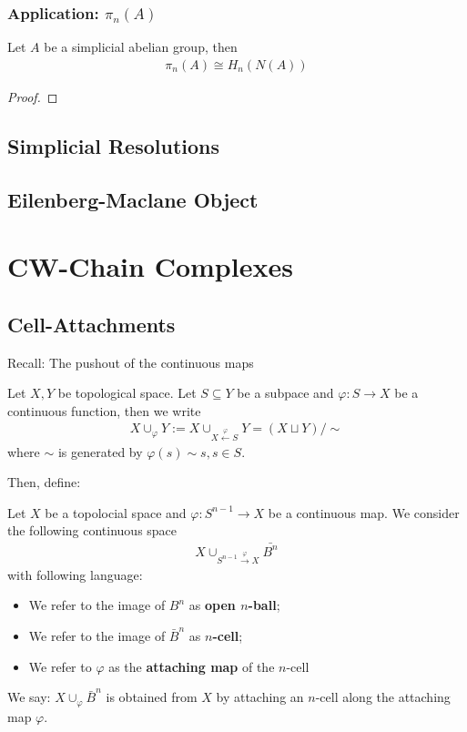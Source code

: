 \documentclass[Total.tex]{subfiles}
\begin{document}
			\subsection{Application: $\pi_n(A)$}
				\begin{corollary}
					Let $A$ be a simplicial abelian group, then
					\begin{gather*}
						\pi_n(A)\cong H_n(N(A))
					\end{gather*}
				\end{corollary}
				\begin{proof}
					
				\end{proof}
		\section{Simplicial Resolutions}
		\section{Eilenberg-Maclane Object}
	\chapter{CW-Chain Complexes}
		\section{Cell-Attachments}
			Recall: The pushout of the continuous maps
			\begin{Def}
				Let $X,Y$ be topological space. Let $S\subseteq Y$ be a subpace and $\varphi:S\rightarrow X$ be a continuous function, then we write
				\begin{gather*}
					X\cup_\varphi Y:=X\cup_{X\stackrel{\varphi}{\leftarrow} S} Y=(X\sqcup Y)/\sim
				\end{gather*}
				where $\sim$ is generated by $\varphi(s)\sim s,s\in S$. 
			\end{Def}
			
			Then, define:
				\begin{Def}
				Let $X$ be a topolocial space and $\varphi:S^{n-1}\rightarrow X$ be a continuous map. We consider the following continuous space
				\begin{gather*}
					X\cup_{S^{n-1}\stackrel{\varphi}{\rightarrow} X}\bar{B^n}
				\end{gather*}
				with following language:
				\begin{itemize}
					\item We refer to the image of $B^n$ as \textbf{open $n$-ball};
					\item We refer to the image of $\bar{B}^n$ as \textbf{$n$-cell};
					\item We refer to $\varphi$ as the \textbf{attaching map} of the $n$-cell
				\end{itemize}
				We say: $X\cup_\varphi \bar{B}^n$ is obtained from $X$ by attaching an $n$-cell along the attaching map $\varphi$. 
			\end{Def}
			
\end{document}
